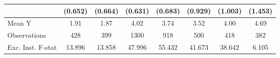 {\begin{tabular}{l*{7}{c}}
            &     (0.652)         &     (0.664)         &     (0.631)         &     (0.683)         &     (0.929)         &     (1.003)         &     (1.453)         \\
\midrule
Mean Y      &        1.91         &        1.87         &        4.02         &        3.74         &        3.52         &        4.00         &        4.69         \\
Observations&         428         &         399         &        1300         &         918         &         500         &         418         &         382         \\
Exc. Inst. F-stat&      13.896         &      13.858         &      47.996         &      55.432         &      41.673         &      38.642         &       6.105         \\
\bottomrule
\end{tabular}
}

